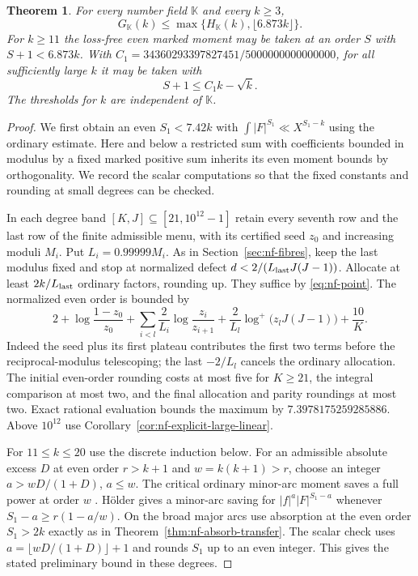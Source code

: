 \documentclass[11pt,letterpaper]{article}
\newtheorem{theorem}{Theorem}[section]
\theoremstyle{definition}
\numberwithin{equation}{section}
\begin{document}
\begin{theorem}\label{thm:nf-all-linear}
For every number field $\mathbb K$ and every $k\ge3$,
\[
 G_{\mathbb K}(k)\le\max\{H_{\mathbb K}(k),\lfloor6.873k\rfloor\}.
\]
For $k\ge11$ the loss-free even marked moment may be taken at an
order $S$ with $S+1<6.873k$. With
$C_1=34360293397827451/5000000000000000$, for all sufficiently
large $k$ it may be taken with
\begin{equation}\label{eq:nf-secondary}
                            S+1\le C_1 k-\sqrt k .
\end{equation}
The thresholds for $k$ are independent of $\mathbb K$.
\end{theorem}
\begin{proof}
We first obtain an even $S_1<7.42k$ with
$\int|F|^{S_1}\ll X^{S_1-k}$ using the ordinary estimate. Here
and below a restricted sum with coefficients bounded in modulus
by a fixed marked positive sum inherits its even moment bounds by
orthogonality. We record the scalar computations so that the fixed
constants and rounding at small degrees can be checked.

In each degree band $[K,J]\subseteq[21,10^{12}-1]$ retain every
seventh row and the last row of the finite admissible menu, with
its certified seed $z_0$ and increasing moduli $M_i$. Put
$L_i=0.99999M_i$. As in Section~\ref{sec:nf-fibres}, keep the
last modulus fixed and stop at normalized defect
$d< 2/(L_{\rm last}J(J-1))$. Allocate at least
$2k/L_{\rm last}$ ordinary factors, rounding up. They suffice
by \eqref{eq:nf-point}. The normalized even order is bounded by
\[
 2+\log\frac{1-z_0}{z_0}
 +\sum_{i<l}\frac{2}{L_i}\log\frac{z_i}{z_{i+1}}
 +\frac{2}{L_l}\log^+\big(z_l J(J-1)\big)+\frac{10}{K}.
\]
Indeed the seed plus its first plateau contributes the first two
terms before the reciprocal-modulus telescoping; the last
$-2/L_l$ cancels the ordinary allocation. The initial even-order
rounding costs at most five for $K\ge21$, the integral comparison
at most two, and the final allocation and parity roundings at most
two. Exact rational evaluation bounds the maximum by
$7.3978175259285886$. Above $10^{12}$ use
Corollary~\ref{cor:nf-explicit-large-linear}.

For $11\le k\le20$ use the discrete induction below. For an
admissible absolute excess $D$ at even order $r>k+1$ and
$w=k(k+1)>r$, choose an integer $a>wD/(1+D)$, $a\le w$.
The critical ordinary minor-arc moment saves a full power at order
$w$ \cite[Lemma~3.1]{NFSmallSupplement}. H\"older gives a
minor-arc saving for $|f|^a|F|^{S_1-a}$ whenever
$S_1-a\ge r(1-a/w)$. On the broad major arcs use absorption
at the even order $S_1>2k$ exactly as in
Theorem~\ref{thm:nf-absorb-transfer}. The scalar check uses
$a=\lfloor wD/(1+D)\rfloor+1$ and rounds $S_1$ up to an even
integer. This gives the stated preliminary bound in these degrees.


\end{proof}
\end{document}

